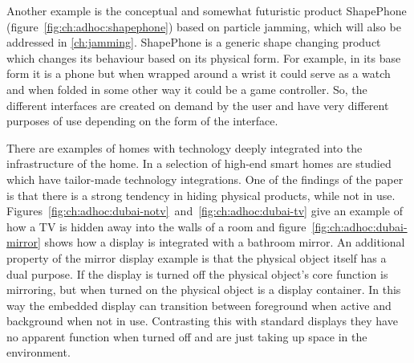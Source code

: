 Another example is the conceptual and somewhat futuristic product ShapePhone (figure~\ref{fig:ch:adhoc:shapephone}) based on particle jamming, which will also be addressed in \autoref{ch:jamming}.
ShapePhone is a generic shape changing product which changes its behaviour based on its physical form.
For example, in its base form it is a phone but when wrapped around a wrist it could serve as a watch and when folded in some other way it could be a game controller.
So, the different interfaces are created on demand by the user and have very different purposes of use depending on the form of the interface.

There are examples of homes with technology deeply integrated into the infrastructure of the home.
In \citet{lynggaard2012had} a selection of high-end smart homes are studied which have tailor-made technology integrations.
One of the findings of the paper is that there is a strong tendency in hiding physical products, while not in use.
Figures~\ref{fig:ch:adhoc:dubai-notv}~and~\ref{fig:ch:adhoc:dubai-tv} give an example of how a TV is hidden away into the walls of a room and figure~\ref{fig:ch:adhoc:dubai-mirror} shows how a display is integrated with a bathroom mirror.
An additional property of the mirror display example is that the physical object itself has a dual purpose.
If the display is turned off the physical object's core function is mirroring, but when turned on the physical object is a display container.
In this way the embedded display can transition between foreground when active and background when not in use.
Contrasting this with standard displays they have no apparent function when turned off and are just taking up space in the environment.

